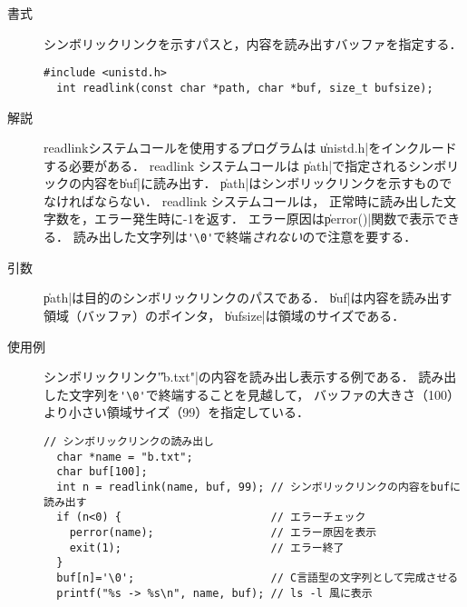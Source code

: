 \begin{description}
\item[書式] シンボリックリンクを示すパスと，内容を読み出すバッファを指定する．
\begin{lstlisting}[numbers=none]
  #include <unistd.h>
  int readlink(const char *path, char *buf, size_t bufsize);
\end{lstlisting}

\item[解説] readlinkシステムコールを使用するプログラムは
\|unistd.h|をインクルードする必要がある．
readlink システムコールは
\|path|で指定されるシンボリックの内容を\|buf|に読み出す．
\|path|はシンボリックリンクを示すものでなければならない．
readlink システムコールは，
正常時に読み出した文字数を，エラー発生時に-1を返す．
エラー原因は\|perror()|関数で表示できる．
読み出した文字列は\verb;'\0';で終端\emph{されない}ので注意を要する．

\item[引数] \|path|は目的のシンボリックリンクのパスである．
\|buf|は内容を読み出す領域（バッファ）のポインタ，
\|bufsize|は領域のサイズである．

\item[使用例] シンボリックリンク\|"b.txt"|の内容を読み出し表示する例である．
読み出した文字列を\verb;'\0';で終端することを見越して，
バッファの大きさ（100）より小さい領域サイズ（99）を指定している．
\begin{lstlisting}[numbers=none]
  // シンボリックリンクの読み出し
  char *name = "b.txt";
  char buf[100];
  int n = readlink(name, buf, 99); // シンボリックリンクの内容をbufに読み出す
  if (n<0) {                       // エラーチェック
    perror(name);                  // エラー原因を表示
    exit(1);                       // エラー終了
  }
  buf[n]='\0';                     // C言語型の文字列として完成させる
  printf("%s -> %s\n", name, buf); // ls -l 風に表示
\end{lstlisting}
\end{description}

